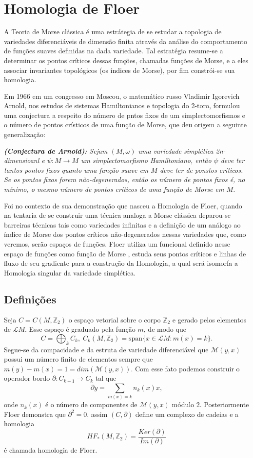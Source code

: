 \documentclass[12pt]{book}
\newcommand{\inteiros}{\mathbb{Z}}
\newcommand{\solucoesperiodicascontrateis}{\mathcal{L}M}
\begin{document}
	\chapter{Homologia de Floer}
	A Teoria de Morse clássica é uma estrátegia de se estudar a topologia de variedades diferenciáveis de dimensão finita através da análise do comportamento de funções suaves definidas na dada variedade. Tal estratégia resume-se a determinar os pontos críticos dessas funções, chamadas funções de Morse, e a eles associar invariantes topológicos (os índices de Morse), por fim constrói-se sua homologia.
	
	Em 1966 em um congresso em Moscou, o matemático russo Vladimir Igorevich Arnold, nos estudos de sistemas Hamiltonianos e topologia do 2-toro, formulou uma conjectura a respeito do número de pntos fixos de um simplectomorfismos e o número de pontos crísticos de uma função de Morse, que deu origem a seguinte generalização:
	
	\textit{\textbf{(Conjectura de Arnold):} Sejam $(M, \omega)$ uma variedade simplética 2n-dimensioanl e $\psi : M \to M $ um simplectomorfismo Hamiltoniano, então $\psi$ deve ter tantos pontos fixos quanto uma função suave em $M$ deve ter de ponstos críticos. Se os pontos fixos forem não-degenerados, então os número de pontos fixos é, no mínimo, o mesmo número de pontos críticos de uma função de Morse em $M$.}
	
	Foi no contexto de sua demonstração que nasceu a Homologia de Floer, quando na tentaria de se construir uma técnica analoga a  Morse clássica deparou-se barreiras técnicas tais como variedades infinitas e a definição de um análogo ao índice de Morse dos pontos críticos não-degenerados nessas variedades que, como veremos, serão espaços de funções. Floer utiliza um funcional definido nesse espaço de funções como função de Morse , estuda seus pontos críticos e linhas de fluxo de seu gradiente para a construção da Homologia, a qual será isomorfa a Homologia singular da variedade simplética.
	
	\section{Definições}
	Seja $C = C(M, \inteiros_{2})$ o espaço vetorial sobre o corpo $\inteiros_{2}$ e gerado pelos elementos de $\solucoesperiodicascontrateis$. Esse espaço é graduado pela função $m$, de modo que
	$$
	C = \bigoplus_{k}C_{k}, \; C_{k}(M, \inteiros_{2}) = \text{span}\{x \in \solucoesperiodicascontrateis:m(x)=k \}.
	$$
	Segue-se da compacidade e da estruta de variedade diferenciável que $\mathcal{M}(y,x)$ possui um número finito de elementos sempre que $ m(y)-m(x)=1 = dim(\mathcal{M}(y,x))$. Com esse fato podemos construir o operador bordo $\partial : C_{k+1} \to C_{k}$ tal que
	$$
	\partial y = \sum_{m(x)=k} n_{k}(x) x,	
	$$
	onde $n_{k}(x)$ é o número de componentes de $\mathcal{M}(y,x)$ módulo 2. Posteriormente Floer demonstra que $\partial^{2}=0$, assim $(C,\partial)$ define um complexo de cadeias e a homologia
	$$
	HF_{*}(M, \inteiros_{2}) = \frac{Ker(\partial)}{Im(\partial)}
	$$
	é chamada homologia de Floer.
	
\end{document}
